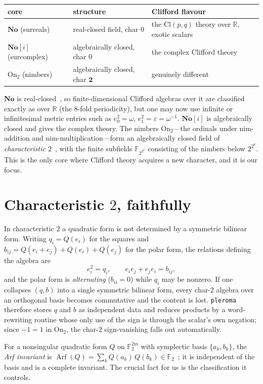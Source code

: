 \documentclass[11pt]{article}
\theoremstyle{definition}
\newcommand{\No}{\mathbf{No}}
\newcommand{\On}{\mathrm{On}_2}
\newcommand{\F}{\mathbb{F}}
\newcommand{\Arf}{\operatorname{Arf}}
\newcommand{\Cl}{\mathrm{Cl}}
\begin{document}
\begin{center}
\begin{tabular}{lll}
\toprule
core & structure & Clifford flavour \\
\midrule
$\No$ (surreals) & real-closed field, char $0$ & the $\Cl(p,q)$ theory over $\mathbb{R}$, exotic scalars \\
$\No[i]$ (surcomplex) & algebraically closed, char $0$ & the complex Clifford theory \\
$\On$ (nimbers) & algebraically closed, char $\mathbf{2}$ & genuinely different \\
\bottomrule
\end{tabular}
\end{center}

\noindent
$\No$ is real-closed~\cite{Conway76}, so finite-dimensional Clifford algebras
over it are classified exactly as over $\mathbb{R}$ (the $8$-fold periodicity),
but one may now use infinite or infinitesimal metric entries such as
$e_0^2=\omega$, $e_1^2=\varepsilon=\omega^{-1}$. $\No[i]$ is algebraically
closed and gives the complex theory. The nimbers $\On$---the ordinals under
nim-addition and nim-multiplication---form an algebraically closed field of
\emph{characteristic $2$}~\cite{Conway76}, with the finite subfields
$\F_{2^{2^k}}$ consisting of the nimbers below $2^{2^k}$. This is the only core
where Clifford theory acquires a new character, and it is our focus.

\section{Characteristic $2$, faithfully}

In characteristic $2$ a quadratic form is not determined by a symmetric bilinear
form. Writing $q_i = Q(e_i)$ for the squares and $b_{ij}=Q(e_i+e_j)+Q(e_i)+Q(e_j)$
for the polar form, the relations defining the algebra are
\[
  e_i^2 = q_i, \qquad e_i e_j + e_j e_i = b_{ij},
\]
and the polar form is \emph{alternating} ($b_{ii}=0$) while $q_i$ may be nonzero.
If one collapses $(q,b)$ into a single symmetric bilinear form, every char-$2$
algebra over an orthogonal basis becomes commutative and the content is lost.
\texttt{pleroma} therefore stores $q$ and $b$ as independent data and reduces
products by a word-rewriting routine whose only use of the sign is through the
scalar's own negation; since $-1=1$ in $\On$, the char-$2$ sign-vanishing falls
out automatically.

For a nonsingular quadratic form $Q$ on $\F_2^{2m}$ with symplectic basis
$\{a_k,b_k\}$, the \emph{Arf invariant} is
\(
  \Arf(Q) = \sum_{k} Q(a_k)\,Q(b_k) \in \F_2
\)~\cite{Arf41};
it is independent of the basis and is a complete invariant. The crucial fact for
us is the classification it controls.
\end{document}
